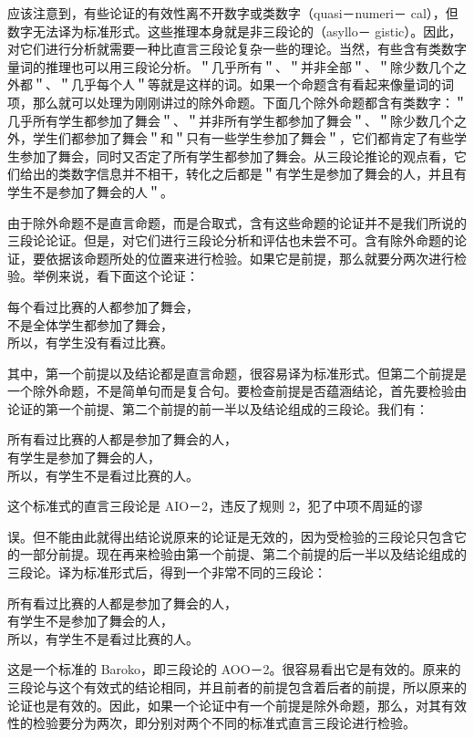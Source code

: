 应该注意到，有些论证的有效性离不开数字或类数字（quasi－numeri－ cal），但数字无法译为标准形式。这些推理本身就是非三段论的（asyllo－ gistic）。因此，对它们进行分析就需要一种比直言三段论复杂一些的理论。当然，有些含有类数字量词的推理也可以用三段论分析。＂几乎所有＂、＂并非全部＂、＂除少数几个之外都＂、＂几乎每个人＂等就是这样的词。如果一个命题含有看起来像量词的词项，那么就可以处理为刚刚讲过的除外命题。下面几个除外命题都含有类数字：＂几乎所有学生都参加了舞会＂、＂并非所有学生都参加了舞会＂、＂除少数几个之外，学生们都参加了舞会＂和＂只有一些学生参加了舞会＂，它们都肯定了有些学生参加了舞会，同时又否定了所有学生都参加了舞会。从三段论推论的观点看，它们给出的类数字信息并不相干，转化之后都是＂有学生是参加了舞会的人，并且有学生不是参加了舞会的人＂。

由于除外命题不是直言命题，而是合取式，含有这些命题的论证并不是我们所说的三段论论证。但是，对它们进行三段论分析和评估也未尝不可。含有除外命题的论证，要依据该命题所处的位置来进行检验。如果它是前提，那么就要分两次进行检验。举例来说，看下面这个论证：

\begin{displayquote}
每个看过比赛的人都参加了舞会，\\
不是全体学生都参加了舞会，\\
所以，有学生没有看过比赛。
\end{displayquote}

其中，第一个前提以及结论都是直言命题，很容易译为标准形式。但第二个前提是一个除外命题，不是简单句而是复合句。要检查前提是否蕴涵结论，首先要检验由论证的第一个前提、第二个前提的前一半以及结论组成的三段论。我们有：

\begin{displayquote}
所有看过比赛的人都是参加了舞会的人，\\
有学生是参加了舞会的人，\\
所以，有学生不是看过比赛的人。
\end{displayquote}

这个标准式的直言三段论是 AIO－2，违反了规则 2，犯了中项不周延的谬

误。但不能由此就得出结论说原来的论证是无效的，因为受检验的三段论只包含它的一部分前提。现在再来检验由第一个前提、第二个前提的后一半以及结论组成的三段论。译为标准形式后，得到一个非常不同的三段论：

所有看过比赛的人都是参加了舞会的人，\\
有学生不是参加了舞会的人，\\
所以，有学生不是看过比赛的人。

这是一个标准的 Baroko，即三段论的 AOO－2。很容易看出它是有效的。原来的三段论与这个有效式的结论相同，并且前者的前提包含着后者的前提，所以原来的论证也是有效的。因此，如果一个论证中有一个前提是除外命题，那么，对其有效性的检验要分为两次，即分别对两个不同的标准式直言三段论进行检验。

